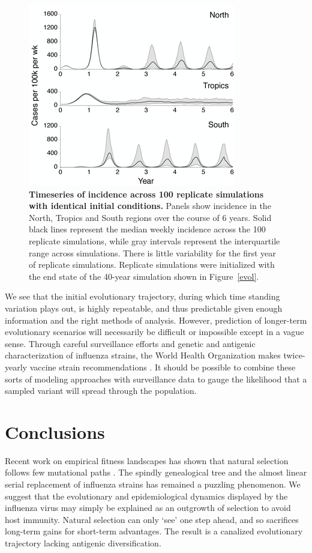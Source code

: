 \documentclass[11pt,oneside,letterpaper]{article}
\begin{document}
\begin{figure}[tb]
	\centering
	\includegraphics{figures/replicateinc}
	\caption{\textbf{Timeseries of incidence across 100 replicate simulations with identical initial conditions.} Panels show incidence in the North, Tropics and South regions over the course of 6 years.  Solid black lines represent the median weekly incidence across the 100 replicate simulations, while gray intervals represent the interquartile range across simulations.  There is little variability for the first year of replicate simulations.  Replicate simulations were initialized with the end state of the 40-year simulation shown in Figure~\ref{evol}.}
	\label{replicateinc}
\end{figure}

We see that the initial evolutionary trajectory, during which time standing variation plays out, is highly repeatable, and thus predictable given enough information and the right methods of analysis.  However, prediction of longer-term evolutionary scenarios will necessarily be difficult or impossible except in a vague sense.    Through careful surveillance efforts and genetic and antigenic characterization of influenza strains, the World Health Organization makes twice-yearly vaccine strain recommendations \cite{Barr10}.  It should be possible to combine these sorts of modeling approaches with surveillance data to gauge the likelihood that a sampled variant will spread through the population.

\section*{Conclusions}

Recent work on empirical fitness landscapes has shown that natural selection follows few mutational paths \cite{Weinreich06}.  The spindly genealogical tree and the almost linear serial replacement of influenza strains has remained a puzzling phenomenon.  We suggest that the evolutionary and epidemiological dynamics displayed by the influenza virus may simply be explained as an outgrowth of selection to avoid host immunity.  Natural selection can only `see' one step ahead, and so sacrifices long-term gains for short-term advantages.  The result is a canalized evolutionary trajectory lacking antigenic diversification.
\end{document}
